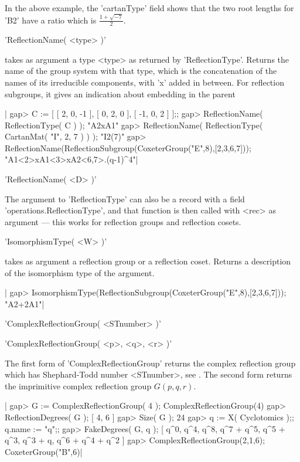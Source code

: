 In  the  above  example,  the  'cartanType'  field  shows that the two root
lengths for 'B2' have a ratio which is $\frac{1+\sqrt{-7}}{2}$.


'ReflectionName( <type> )'

takes  as argument a  type <type> as  returned by 'ReflectionType'. Returns
the  name of the group system with  that type, which is the concatenation of
the names of its irreducible components, with 'x' added in between. For
reflection subgroups, it gives an indication about embedding in the parent

|    gap> C := [ [ 2, 0, -1 ], [ 0, 2, 0 ], [ -1, 0, 2 ] ];;
    gap> ReflectionName( ReflectionType( C ) );
    "A2xA1"
    gap> ReflectionName( ReflectionType( CartanMat( "I", 2, 7 ) ) );
    "I2(7)"
    gap> ReflectionName(ReflectionSubgroup(CoxeterGroup("E",8),[2,3,6,7]));
    "A1<2>xA1<3>xA2<6,7>.(q-1)^4"|

'ReflectionName( <D> )'

The  argument  to  'ReflectionType'  can  also  be  a  record  with a field
'operations.ReflectionType', and that function is then called with <rec> as
argument --- this works for reflection groups and reflection cosets.


'IsomorphismType( <W> )'

takes  as  argument  a  reflection  group  or a reflection coset. Returns a
description of the isomorphism type of the argument.

|    gap> IsomorphismType(ReflectionSubgroup(CoxeterGroup("E",8),[2,3,6,7]));
     "A2+2A1"|


'ComplexReflectionGroup( <STnumber> )'

'ComplexReflectionGroup( <p>, <q>, <r> )'

The first form of 'ComplexReflectionGroup' returns the complex reflection
group  which has Shephard-Todd  number  <STnumber>, see \cite{ST54}.  The
second form returns the imprimitive complex reflection group $G(p,q,r)$.

|    gap> G := ComplexReflectionGroup( 4 );
    ComplexReflectionGroup(4)
    gap> ReflectionDegrees( G );
    [ 4, 6 ]
    gap> Size( G );
    24
    gap> q := X( Cyclotomics );; q.name := "q";;
    gap> FakeDegrees( G, q );
    [ q^0, q^4, q^8, q^7 + q^5, q^5 + q^3, q^3 + q, q^6 + q^4 + q^2 ]
    gap> ComplexReflectionGroup(2,1,6);
    CoxeterGroup("B",6)|

